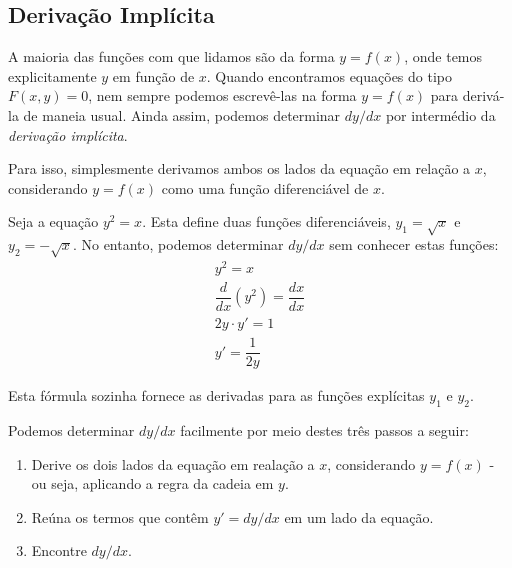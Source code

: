 \subsection{Derivação Implícita}
A maioria das funções com que lidamos são da forma $y=f(x)$, onde temos explicitamente $y$ em função de $x$. Quando encontramos equações do tipo $F(x,y)=0$, nem sempre podemos escrevê-las na forma $y=f(x)$ para derivá-la de maneia usual. Ainda assim, podemos determinar $dy/dx$ por intermédio da \emph{derivação implícita}. \par Para isso, simplesmente derivamos ambos os lados da equação em relação a $x$, considerando $y=f(x)$ como uma função diferenciável de $x$.
\begin{exemplo}
Seja a equação $y^2=x$. Esta define duas funções diferenciáveis, $y_1=\sqrt{x}$ e $y_2=-\sqrt{x}$. No entanto, podemos determinar $dy/dx$ sem conhecer estas funções:
\begin{align*}
y^2=x\\
\dfrac{d}{dx}(y^2)=\dfrac{dx}{dx}\\
2y\cdot y' =1\\
y'=\dfrac{1}{2y}
\end{align*}

\begin{center}
\end{center}
Esta fórmula sozinha fornece as derivadas para as funções explícitas $y_1$ e $y_2$.
\end{exemplo}
Podemos determinar $dy/dx$ facilmente por meio destes três passos a seguir:
\begin{enumerate}[1.]
\item Derive os dois lados da equação em realação a $x$, considerando $y=f(x)$ - ou seja, aplicando a regra da cadeia em $y$.
\item Reúna os termos que contêm $y'=dy/dx$ em um lado da equação.
\item Encontre $dy/dx$.
\end{enumerate}
